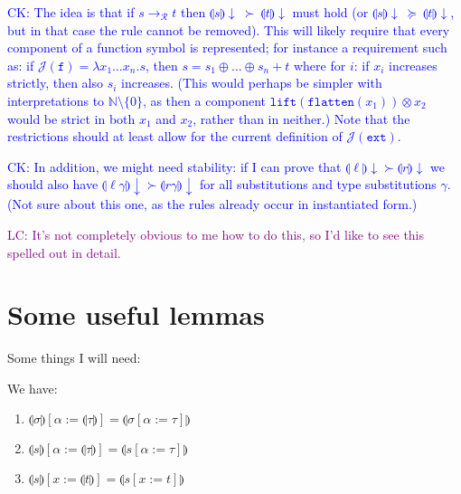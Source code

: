 \documentclass[runningheads,a4paper]{llncs}
\newcommand{\Rules}{\mathcal{R}}
\newcommand{\Termmap}{\mathcal{J}}
\newcommand{\typeinterpret}[1]{\llparenthesis #1 \rrparenthesis}
\newcommand{\interpret}[1]{\llparenthesis #1 \rrparenthesis}
\newcommand{\arr}[1]{\longrightarrow_{#1}}
\newcommand{\abs}[2]{\lambda #1.#2}
\newcommand{\flatten}{\mathtt{flatten}}
\newcommand{\lift}{\mathtt{lift}}
\newcommand{\CK}[1]{\textcolor{blue}{CK: #1}}
\newcommand{\LC}[1]{\textcolor{purple}{LC: #1}}
\begin{document}
\CK{%
The idea is that if $s \arr{\Rules} t$ then $\interpret{s}\downarrow\:
\succ\:\interpret{t}\downarrow$ must hold (or $\interpret{s}\downarrow\:
\succeq\:\interpret{t}\downarrow$, but in that case the rule cannot be
removed).  This will likely require that every component of a function
symbol is represented; for instance a requirement such as: if
$\Termmap(\mathtt{f}) = \abs{x_1 \dots x_n}{s}$, then $s = s_1 \oplus
\dots \oplus s_n + t$ where for $i$: if $x_i$ increases strictly,
then also $s_i$ increases.
(This would perhaps be simpler with interpretations to $\mathbb{N}
\setminus \{ 0 \}$, as then a component $\lift(\flatten(x_1)) \otimes
x_2$ would be strict in both $x_1$ and $x_2$, rather than in neither.)
Note that the restrictions should at least allow for the current
definition of $\Termmap(\mathtt{ext})$.}

\CK{In addition, we might need stability: if I can prove that
$\interpret{\ell} \downarrow \succ \interpret{r}\downarrow$ we should
also have $\interpret{\ell\gamma}\downarrow \succ
\interpret{r\gamma}\downarrow$ for all substitutions and type
substitutions $\gamma$.  (Not sure
about this one, as the rules already occur in instantiated form.)}

\LC{It's not completely obvious to me how to do this, so I'd like to
  see this spelled out in detail.}

%

\section{Some useful lemmas}

Some things I will need:

\begin{lemma}\label{lem:substitutioninterpret}
We have:
\begin{enumerate}
\item\label{lem:substitutioninterpret:types}
  $\typeinterpret{\sigma}[\alpha:=\typeinterpret{\tau}] =
  \typeinterpret{\sigma[\alpha:=\tau]}$
\item\label{lem:substitutioninterpret:mixed}
  $\interpret{s}[\alpha:=\typeinterpret{\tau}] =
  \interpret{s[\alpha:=\tau]}$
\item\label{lem:substitutioninterpret:terms}
  $\interpret{s}[x:=\interpret{t}] = \interpret{s[x:=t]}$
\end{enumerate}
\end{lemma}
\end{document}
